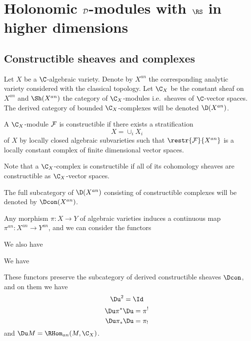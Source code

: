 \documentclass[etingof-dmod.tex]{subfiles}
\begin{document}
\section{Holonomic $\mathcal{D}$-modules with $\RS$ in higher dimensions}

\subsection{Constructible sheaves and complexes}
Let $X$ be a $\C$-algebraic variety. Denote by $X^{an}$ the corresponding
analytic variety considered with the classical topology. Let $\C_X$ be the
constant sheaf on $X^{an}$ and $\Sh(X^{an})$ the category of $\C_X$-modules
i.e.\ sheaves of $\C$-vector spaces. The derived category of bounded $\C_X$-complexes
will be denoted $\D(X^{an})$.

  \begin{defn}
    A $\C_X$-module $\mathcal{F}$ is constructible if there exists a stratification
    $$X = \cup_i X_i$$ of $X$ by locally closed algebraic subvarieties such that
    $\restr{\mc{F}}{X^{an}}$ is a locally constant complex of finite dimensional
    vector spaces.
  \end{defn}

  \begin{rmk}
    Note that a $\C_X$-complex is constructible if all of its cohomology sheaves
    are constructible as $\C_X$-vector spaces.
  \end{rmk}

  The full subcategory of $\D(X^{an})$ consisting of constructible
  complexes will be denoted by $\Dcon(X^{an})$.

  Any morphism $\pi: X \rightarrow Y$ of algebraic varieties induces a
  continuous map $\pi^{an} : X^{an} \rightarrow Y^{an}$, and we can consider the
  functors


  We also have


We have
\begin{thm}These functors preserve the subcategory of derived constructible
  sheaves $\Dcon$, and on them we have
    $$\Du^2 = \Id$$
    $$\Du \pi^* \Du = \pi^!$$
    $$\Du \pi_* \Du = \pi_!$$
    and $\Du M = \RHom_{an}(M, \C_X)$.
\end{thm}
\end{document}
